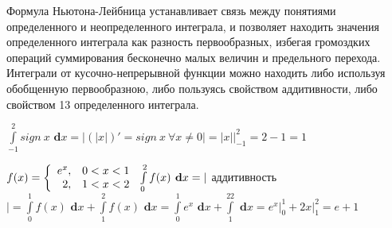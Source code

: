 \documentclass[a4paper,12pt, centered]{bookest}
\theoremstyle{remark}
\newcommand\dx{\textbf{ d}x}
\begin{document}
Формула Ньютона-Лейбница устанавливает связь между понятиями определенного и неопределенного интеграла, и позволяет находить значения определенного интеграла как разность первообразных, избегая громоздких операций суммирования бесконечно малых величин и предельного перехода. Интеграли от кусочно-непрерывной функции можно находить либо используя обобщенную первообразною, либо пользуясь свойством аддитивности, либо свойством 13 определенного интеграла.
\begin{example}
		$\int\limits_{-1}^{2}sign\>x\dx=\left|(|x|)'=sign\>x\>\forall x\ne0 \right|=|x|\big|_{-1}^2=2-1=1$
\end{example}
\begin{example}
	$f(x)=\left\{\begin{array}{rl}
			e^x,&0<x<1\\
			2,&1<x<2
		\end{array}\right.\\\int\limits_0^2f(x)\dx=|$ аддитивность $|=\int\limits_0^1f(x)\dx+\int\limits_1^2f(x)\dx=\int\limits_0^1e^x\dx+\int\limits_1^22\dx=e^x\big|_0^1+2x\big|_1^2=e+1$
\end{example}
\end{document}

